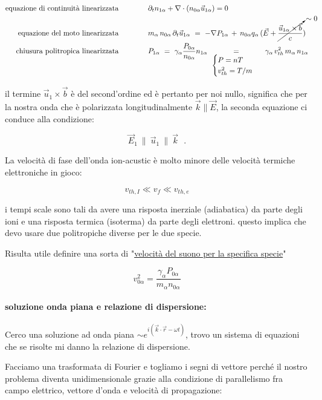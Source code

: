 \[\begin{aligned}
	\text{equazione di continuità linearizzata}\qquad \qquad  
	& \partial_tn_{1\alpha }+\nabla\cdot(n_{0\alpha}\vec u_{1\alpha})=0\\ 
	\text{equazione del moto linearizzata} \qquad \qquad
	& m_\alpha\, n_{0\alpha}\,\partial_t\vec u_{1\alpha}\ =\ -\nabla P_{1\alpha}\,+\,n_{0\alpha}q_{\alpha}\,(\vec E+\cancelto{\sim 0}{\frac{\vec u_{1\alpha}\times\vec b}{c}})\\
	\text{chiusura politropica linearizzata} \qquad \qquad
	& P_{1\alpha}\ =\ \gamma_\alpha\frac{P_{0\alpha}}{n_{0\alpha}}n_{1\alpha}\ \underset{\begin{cases} P=nT\\ v_{th}^2=T/m \end{cases}}{=}\ \gamma_\alpha\,  v^2_{th}\, m_\alpha\,n_{1\alpha}
\end{aligned}\]

il termine $\vec u_1\times\vec b$ è del second'ordine ed è pertanto per noi nullo, significa che per la nostra onda che è polarizzata longitudinalmente $\vec k\parallel \vec E$, la seconda equazione ci conduce alla condizione:

\[\vec E_1\ \parallel\ \vec u_1\ \parallel\ \vec k\ \ \ .\]

La velocità di fase dell'onda ion-acustic è molto minore delle velocità termiche elettroniche in gioco: 

\[v_{th,I}\ll v_f \ll v_{th,e} \] 

i tempi scale sono tali da avere una risposta inerziale (adiabatica) da parte degli ioni e una risposta termica (isoterma) da parte degli elettroni. questo implica che devo usare due politropiche diverse per le due specie. 

Risulta utile definire una sorta di "\underline{velocità del suono per la specifica specie}"

\[\boxed{ v^2_{0\alpha}=\frac{\gamma_\alpha P_{0\alpha}}{m_\alpha n_{0\alpha}} }\] 



\paragraph{soluzione onda piana e relazione di dispersione: } 
Cerco una soluzione ad onda piana $\sim e^{i(\vec k\cdot\vec r-\omega t)}$, trovo un sistema di equazioni che se risolte mi danno la relazione di dispersione.  

Facciamo una trasformata di Fourier e togliamo i segni di vettore perché il nostro problema diventa unidimensionale grazie alla condizione di parallelismo fra campo elettrico, vettore d'onda e velocità di propagazione:

